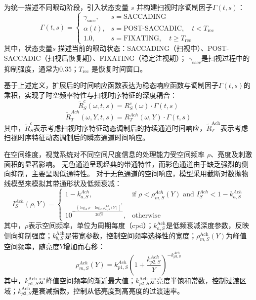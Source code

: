 为统一描述不同眼动阶段，引入状态变量 $s$ 并构建扫视时序调制因子\(\Gamma(t, s)\)：
\begin{equation}
\Gamma(t, s) = 
\begin{cases} 
\gamma_{\text{sacc}}, & s = \text{SACCADING} \\
\alpha(t), & s = \text{POST-SACCADIC}, \quad t < T_{\text{rec}} \\
1.0, & s = \text{FIXATING}, \quad t \geq T_{\text{rec}}
\end{cases}
\label{eq:gamma_factor}
\end{equation}
其中，状态变量$s$ 描述当前的眼动状态：SACCADING（扫视中）、POST-SACCADIC（扫视后恢复期）、FIXATING（稳定注视期）；
$\gamma_{\text{sacc}}$是扫视过程中的抑制强度，通常为0.35\cite{3-2-5}；\(T_{\text{rec}}\) 是恢复时间窗口。

基于上述定义，扩展后的时间响应函数表达为稳态响应函数与调制因子\(\Gamma(t, s)\)的乘积，实现了时空频率特性与扫视时序特征的深度耦合：
\begin{equation}
\tilde{R}_S^c(\omega, t, s) = R_S^c(\omega) \cdot \Gamma(t, s)
\label{eq:modified_sustained}
\end{equation}
\begin{equation}
\tilde{R}_T^{Ach}(\omega, Y, t, s) = R_T^{Ach}(\omega, Y) \cdot \Gamma(t, s)
\label{eq:modified_transient}
\end{equation}
其中，\(\tilde{R}_S^c\)表示考虑扫视时序特征动态调制后的持续通道时间响应，\(\tilde{R}_T^{\text{Ach}}\)表示考虑扫视时序特征动态调制后的瞬态通道时间响应。

在空间维度，视觉系统对不同空间尺度信息的处理能力受空间频率 $\rho$、亮度及刺激面积的显著影响。
无色通道呈现经典的带通特性，而彩色通道由于缺乏强烈的侧向抑制，主要呈现低通特性。
对于无色通道的空间响应，模型采用截断对数抛物线模型来模拟其带通形状及低频衰减\cite{1-2-9}：
\begin{equation}
I_S^{Ach}(\rho, Y) = 
\begin{cases} 
1 - k_{a,S}^{Ach}, & \text{if } \rho < \rho_{m,S}^{Ach}(Y) \text{ and } I_S^{Ach} < 1 - k_{a,S}^{Ach} \\
10^{-\frac{\left(\log_{10}\rho - \log_{10}\rho_{m,S}^{Ach}(Y)\right)^2}{2k_{b,S}^{Ach}}}, & \text{otherwise}
\end{cases}
\label{eq:ach_spatial_response}
\end{equation}
其中，\(\rho\)表示空间频率，单位为周期每度（cpd）；\(k_{a,S}^{\text{Ach}}\)是低频衰减深度参数，反映侧向抑制强度；\(k_{b,S}^{\text{Ach}}\)是带宽参数，控制空间频率选择性的宽度；$\rho_{m,S}^{\text{Ach}}(Y)$为峰值空间频率，随亮度$Y$增加而右移\cite{1-2-9}：
\begin{equation}
\rho_{m,S}^{Ach}(Y) = k_{p1,S}^{Ach} \left(1 + \frac{k_{p2,S}^{Ach}}{Y}\right)^{-k_{p3,S}^{Ach}}
\label{eq:peak_spatial_freq}
\end{equation}
其中，\(k_{p1,S}^{\text{Ach}}\)是峰值空间频率的渐近最大值；\(k_{p2,S}^{\text{Ach}}\)是亮度半饱和常数，控制过渡区域；\(k_{p3,S}^{\text{Ach}}\)是衰减指数，控制从低亮度到高亮度的过渡速率。

